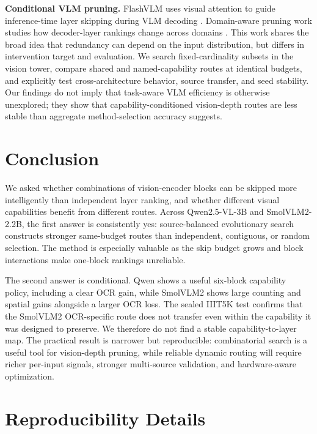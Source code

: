 \documentclass[10pt]{article}
\begin{document}
\textbf{Conditional VLM pruning.} FlashVLM uses visual attention to
guide inference-time layer skipping during VLM decoding
\citep{sarkar2026flashvlm}. Domain-aware pruning work studies how
decoder-layer rankings change across domains
\citep{khaki2026domainaware}. This work shares the broad idea that
redundancy can depend on the input distribution, but differs in
intervention target and evaluation. We search fixed-cardinality subsets
in the vision tower, compare shared and named-capability routes at
identical budgets, and explicitly test cross-architecture behavior,
source transfer, and seed stability. Our findings do not imply that
task-aware VLM efficiency is otherwise unexplored; they show that
capability-conditioned vision-depth routes are less stable than
aggregate method-selection accuracy suggests.

\section{Conclusion}\label{conclusion}

We asked whether combinations of vision-encoder blocks can be skipped
more intelligently than independent layer ranking, and whether different
visual capabilities benefit from different routes. Across Qwen2.5-VL-3B
and SmolVLM2-2.2B, the first answer is consistently yes: source-balanced
evolutionary search constructs stronger same-budget routes than
independent, contiguous, or random selection. The method is especially
valuable as the skip budget grows and block interactions make one-block
rankings unreliable.

The second answer is conditional. Qwen shows a useful six-block
capability policy, including a clear OCR gain, while SmolVLM2 shows
large counting and spatial gains alongside a larger OCR loss. The sealed
IIIT5K test confirms that the SmolVLM2 OCR-specific route does not
transfer even within the capability it was designed to preserve. We
therefore do not find a stable capability-to-layer map. The practical
result is narrower but reproducible: combinatorial search is a useful
tool for vision-depth pruning, while reliable dynamic routing will
require richer per-input signals, stronger multi-source validation, and
hardware-aware optimization.

\appendix

\section{Reproducibility Details}\label{reproducibility-details}
\end{document}
